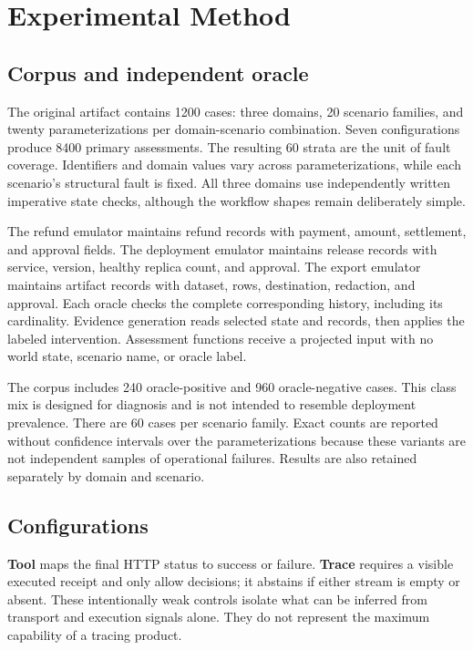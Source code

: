 \documentclass[11pt]{article}
\begin{document}
\section{Experimental Method}
\subsection{Corpus and independent oracle}
The original artifact contains 1200 cases: three domains, 20 scenario families, and twenty parameterizations per domain-scenario combination. Seven configurations produce 8400 primary assessments. The resulting 60 strata are the unit of fault coverage. Identifiers and domain values vary across parameterizations, while each scenario's structural fault is fixed. All three domains use independently written imperative state checks, although the workflow shapes remain deliberately simple.

The refund emulator maintains refund records with payment, amount, settlement, and approval fields. The deployment emulator maintains release records with service, version, healthy replica count, and approval. The export emulator maintains artifact records with dataset, rows, destination, redaction, and approval. Each oracle checks the complete corresponding history, including its cardinality. Evidence generation reads selected state and records, then applies the labeled intervention. Assessment functions receive a projected input with no world state, scenario name, or oracle label.

The corpus includes 240 oracle-positive and 960 oracle-negative cases. This class mix is designed for diagnosis and is not intended to resemble deployment prevalence. There are 60 cases per scenario family. Exact counts are reported without confidence intervals over the parameterizations because these variants are not independent samples of operational failures. Results are also retained separately by domain and scenario.

\subsection{Configurations}
\textbf{Tool} maps the final HTTP status to success or failure. \textbf{Trace} requires a visible executed receipt and only allow decisions; it abstains if either stream is empty or absent. These intentionally weak controls isolate what can be inferred from transport and execution signals alone. They do not represent the maximum capability of a tracing product.
\end{document}
